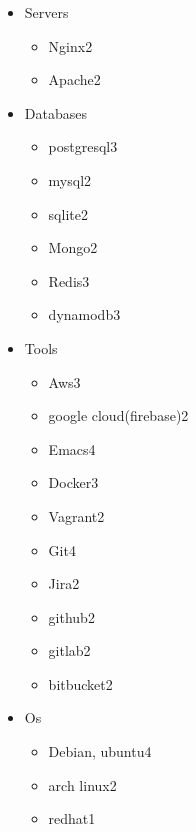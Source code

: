 \documentclass[11pt,letter,sans]{moderncv}
\begin{document}
\begin{itemize}
      \item Servers
      \begin{itemize}
\item Nginx\hfill 2\item Apache\hfill 2\end{itemize}
      \item Databases
      \begin{itemize}
\item postgresql\hfill 3\item mysql\hfill 2\item sqlite\hfill 2\item Mongo\hfill 2\item Redis\hfill 3\item dynamodb\hfill 3\end{itemize}
      \item Tools
      \begin{itemize}
\item Aws\hfill 3\item google cloud(firebase)\hfill 2\item Emacs\hfill 4\item Docker\hfill 3\item Vagrant\hfill 2\item Git\hfill 4\item Jira\hfill 2\item github\hfill 2\item gitlab\hfill 2\item bitbucket\hfill 2\end{itemize}
      \item Os
      \begin{itemize}
\item Debian, ubuntu\hfill 4\item arch linux\hfill 2\item redhat\hfill 1\end{itemize}
  \end{itemize}
\end{document}
